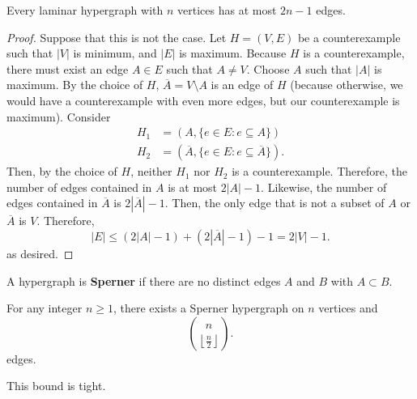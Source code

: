 \begin{lemma}
	Every laminar hypergraph with \( n \) vertices has at most \( 2n-1 \) edges.
\end{lemma}
\begin{proof}
	Suppose that this is not the case. Let \( H=(V,E) \) be a counterexample such that \( |V| \) is minimum, and \( |E| \) is maximum. Because \( H \) is a counterexample, there must exist an edge \( A \in E \) such that \( A \neq V \). Choose \( A \) such that \( |A| \) is maximum. By the choice of \( H \), \( \overline{A} = V\setminus A  \) is an edge of \( H \) (because otherwise, we would have a counterexample with even more edges, but our counterexample is maximum). Consider 
	\begin{align*}
		H_{1}&= (A, \{ e \in E: e \subseteq A\}  ) \\
		H_{2}&= (\overline{A}, \{e \in E : e \subseteq \overline{A}\}  ) 
	.\end{align*}
	Then, by the choice of \( H \), neither \( H_{1} \) nor \( H_{2} \) is a counterexample. Therefore, the number of edges contained in \( A \) is at most \( 2|A|-1 \). Likewise, the number of edges contained in \( \overline{A} \) is \( 2|\overline{A}|-1 \). Then, the only edge that is not a subset of \( A \) or \( \overline{A} \) is \( V \). Therefore, \[
		|E| \le (2|A| - 1) + (2|\overline{A}| - 1) - 1 = 2|V| - 1
	.\] as desired.
\end{proof}

\begin{definition}
	A hypergraph is \textbf{Sperner} if there are no distinct edges \( A \) and \( B \) with \( A \subset  B \).
\end{definition}

\begin{corollary}
	For any integer \( n\ge 1 \), there exists a Sperner hypergraph on \( n \) vertices and \[
		\binom{n}{\left\lfloor \frac{n}{2} \right\rfloor}
	.\] edges.
\end{corollary}

\begin{theorem}
	This bound is tight.
\end{theorem}
